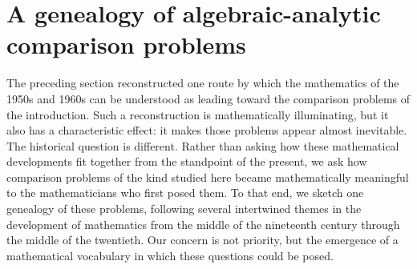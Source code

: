 \documentclass[11pt,leqno]{article}
\renewcommand{\1}{{\rm 1\hspace*{-0.4ex}%
\rule{0.1ex}{1.52ex}\hspace*{0.2ex}}}
\newcommand{\<}[1]{{\langle}#1 {\rangle}}
\newcounter{intro}
\theoremstyle{plain}
\theoremstyle{definition}
\theoremstyle{remark}
\numberwithin{equation}{subsection}
\begin{document}




































































\section{A genealogy of algebraic-analytic comparison problems}
\label{s:genealogy}
The preceding section reconstructed one route by which the mathematics of the 1950s and 1960s can be understood as leading toward the comparison problems of the introduction. Such a reconstruction is mathematically illuminating, but it also has a characteristic effect: it makes those problems appear almost inevitable. The historical question is different. Rather than asking how these mathematical developments fit together from the standpoint of the present, we ask how comparison problems of the kind studied here became mathematically meaningful to the mathematicians who first posed them. To that end, we sketch one genealogy of these problems, following several intertwined themes in the development of mathematics from the middle of the nineteenth century through the middle of the twentieth.  Our concern is not priority, but the emergence of a mathematical vocabulary in which these questions could be posed.
\end{document}
